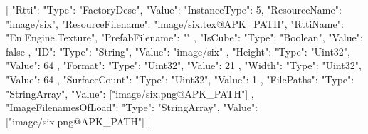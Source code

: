 [{
        "Rtti": {
            "Type": "FactoryDesc",
            "Value": {
                "InstanceType": 5,
                "ResourceName": "image/six",
                "ResourceFilename": "image/six.tex@APK_PATH",
                "RttiName": "En.Engine.Texture",
                "PrefabFilename": ""
            }
        },
        "IsCube": {
            "Type": "Boolean",
            "Value": false
        },
        "ID": {
            "Type": "String",
            "Value": "image/six"
        },
        "Height": {
            "Type": "Uint32",
            "Value": 64
        },
        "Format": {
            "Type": "Uint32",
            "Value": 21
        },
        "Width": {
            "Type": "Uint32",
            "Value": 64
        },
        "SurfaceCount": {
            "Type": "Uint32",
            "Value": 1
        },
        "FilePaths": {
            "Type": "StringArray",
            "Value": ["image/six.png@APK_PATH"]
        },
        "ImageFilenamesOfLoad": {
            "Type": "StringArray",
            "Value": ["image/six.png@APK_PATH"]
        }
    }]